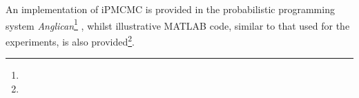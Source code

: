 An implementation of iPMCMC is provided in the probabilistic programming system \emph{Anglican}\footnote{\angurl} \citep{wood2014new}, whilst illustrative MATLAB code, similar to that used for the experiments, is also provided\footnote{\myurl}.


